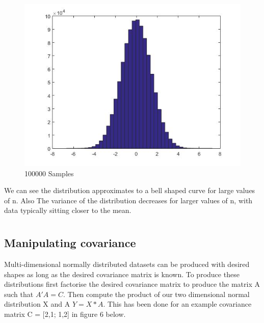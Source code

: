 \documentclass[10pt]{article}
\begin{document}
\begin{figure}[!h]
\begin{minipage}[b]{0.32\textwidth}
    \includegraphics[width=\textwidth]{clt100000.jpg}
    \caption{100000 Samples}
  \end{minipage}
\end{figure}

We can see the distribution approximates to a bell shaped curve for large values of n. Also The variance of the distribution decreases for larger values of n, with data typically sitting closer to the mean. 

\section{}
\subsection{Manipulating covariance}

Multi-dimensional normally distributed datasets can be produced with desired shapes as long as the desired covariance matrix is known. To produce these distributions first factorise the desired covariance matrix to produce the matrix A such that $A'A = C$. Then compute the product of our two dimensional normal distribution X and A $Y = X*A$. This has been done for an example covariance matrix C = [2,1; 1,2] in figure 6 below. 
\end{document}
